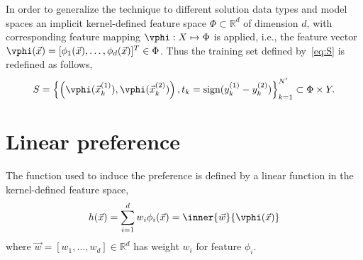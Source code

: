In order to generalize the technique to different solution data types and model spaces an implicit kernel-defined feature space $\Phi\subset\mathbb{R}^d$ of dimension $d$, with corresponding feature mapping $\vphi:X\mapsto\Phi$ is applied, i.e., the feature vector $\vphi(\vec{x})=[\phi_1(\vec{x}),\ldots,\phi_d(\vec{x})]^T\in\Phi$. Thus the training set defined by~\eqref{eq:S} is redefined as follows,
\begin{equation}
S = \left\{\left(\vphi(\vec{x}_k^{(1)}), \vphi(\vec{x}_k^{(2)})\right),t_k=\text{sign}(y_k^{(1)} - y_k^{(2)})\right\}_{k=1}^{N'} \subset \Phi \times Y \label{eq:Sfeat}.
\end{equation}


\section{Linear preference}\label{sec:ord:linpref}
The function used to induce the preference is defined by a linear function in the kernel-defined feature space,
\begin{equation} 
 h(\vec{x})=\sum_{i=1}^d w_i\phi_i(\vec{x})=\inner{\vec{w}}{\vphi(\vec{x})} \label{eq:linearpref}
\end{equation}
where $\vec{w}=[w_1,\ldots,w_d]\in\mathbb{R}^d$ has weight $w_i$ for feature $\phi_i$.


\begin{comment}
Let $\vec{z}$ denote either $\vphi(\vec{x}_k^{(1)})-\vphi(\vec{x}_k^{(2)})$ with \mbox{$t_k=+1$} or 
$\vphi(\vec{x}_k^{(2)})-\vphi(\vec{x}_k^{(1)})$ with \mbox{$t_k=-1$}, positive or negative example respectively.

Logistic regression learns the optimal parameters $\vec{w}\in\mathbb{R}^d$ determined by solving the following task,
\begin{equation}\label{eq:margin}
\min_{\vec{w}}\quad \tfrac{1}{2}\inner{\vec{w}}{\vec{w}} + C \sum_{i=1}^{N'} \log\left(1 + e^{-y_i \inner{\vec{w}}{\vec{z}_i}}\right) 
\end{equation}
where $C > 0$ is a penalty parameter, and the negative log-likelihood is due to the fact the given data point $\vec{z}_i$ and weights $\vec{w}$ are assumed to follow the probability model,
\begin{equation}\label{eq:prob}
\mathcal{P}\big(y=\pm1|\vec{z},\vec{w}\big)=\frac{1}{1+e^{-y\inner{\vec{w}}{\vec{z}_i}}}.
\end{equation}
The logistic regression defined in \eqref{eq:margin} is solved iteratively, in particular using Trust Region Newton method \citep[cf.][]{Lin08:newtontrustregion}, which generates a sequence $\{\vec{w}^{(k)}\}_{k=1}^\infty$ converging to the optimal solution $\vec{w}^*$ of \eqref{eq:margin}.
\end{comment}

